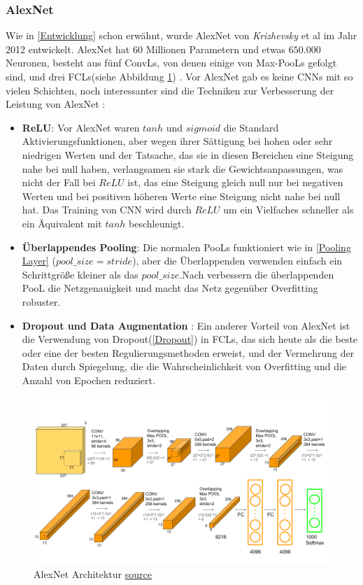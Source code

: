\documentclass[12pt,a4paper]{scrartcl}
\numberwithin{equation}{section}
\begin{document}
\subsubsection{AlexNet}
Wie in \ref{Entwicklung} schon erwähnt, wurde AlexNet von \textit{Krizhevsky} et al \cite{AlexNet} im Jahr 2012 entwickelt. AlexNet hat $ 60 $ Millionen Parametern und etwas $ 650.000 $ Neuronen, besteht aus fünf \acsp{ConvL}, von denen einige von Max-\acsp{PooL} gefolgt sind, und drei \acsp{FCL}(siehe Abbildung \ref{fig:AlexNet}) \cite{AlexNet}. Vor  AlexNet  gab es keine \acsp{CNN} mit so vielen Schichten, noch interessanter sind die Techniken zur Verbesserung der Leistung von  AlexNet :
\begin{itemize}
	\item \textbf{ReLU}: Vor AlexNet waren $ tanh $ und $ sigmoid $ die Standard Aktivierungsfunktionen, aber wegen ihrer Sättigung bei hohen oder sehr niedrigen Werten und der Tatsache, das sie in diesen Bereichen eine Steigung nahe bei null haben, verlangsamen sie stark die Gewichtsanpassungen, was nicht der Fall bei $ ReLU $ ist, das eine Steigung gleich null nur bei negativen Werten und bei positiven höheren Werte  eine Steigung nicht nahe bei null hat. Das Training von \ac{CNN} wird durch $ ReLU $  um ein Vielfaches schneller als ein Äquivalent mit $ tanh $ beschleunigt\cite{AlexNet}.
	
	\item \textbf{Überlappendes Pooling}: Die normalen \acsp{PooL} funktioniert wie in \ref{Pooling Layer} ($ pool\_size = stride$), aber die Überlappenden verwenden einfach ein Schrittgröße kleiner als das $ pool\_size $.Nach \cite{AlexNet} verbessern die überlappenden \ac{PooL}  die Netzgenauigkeit und macht das Netz gegenüber Overfitting robuster.
	\item \textbf{Dropout und Data Augmentation }: Ein anderer Vorteil von AlexNet ist die Verwendung von Dropout(\ref{Dropout}) in \acsp{FCL}, das sich heute als die beste oder eine der besten Regulierungsmethoden erweist, und der Vermehrung der Daten durch Spiegelung, die die Wahrscheinlichkeit von Overfitting und die Anzahl von Epochen reduziert.
\end{itemize}
\begin{figure}[h]
	\centering
	\includegraphics[width=\textwidth ]{AlexNet}
	\caption{ AlexNet Architektur \href{https://neurohive.io/en/popular-networks/alexnet-imagenet-classification-with-deep-convolutional-neural-networks/}{ source} }
	\label{fig:AlexNet}
\end{figure}
\end{document}
